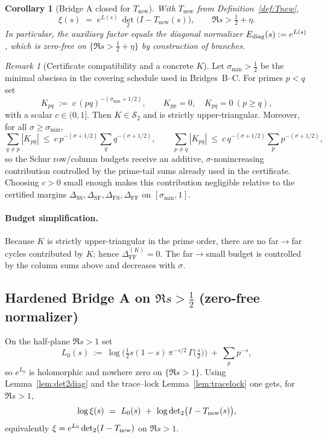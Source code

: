 \documentclass[11pt]{article}
\newtheorem{corollary}[theorem]{Corollary}
\theoremstyle{definition}
\theoremstyle{remark}
\newtheorem{remark}[theorem]{Remark}
\newcommand{\HS}{\mathcal{S}_2}
\begin{document}
\begin{corollary}[Bridge A closed for $T_{\mathrm{new}}$]\label{cor:BA-closed}
With $T_{\mathrm{new}}$ from Definition~\ref{def:Tnew},
\[
  \xi(s)\;=\;e^{L(s)}\,\det_{2}\big(I-T_{\mathrm{new}}(s)\big),\qquad \Re s>\tfrac12+\eta.
\]
In particular, the auxiliary factor equals the diagonal normalizer $E_{\rm diag}(s):=e^{L(s)}$, which is zero-free on $\{\Re s>\tfrac12+\eta\}$ by construction of branches.
\end{corollary}

\begin{remark}[Certificate compatibility and a concrete $K$]\label{rem:K-choice}
Let $\sigma_{\min}>\tfrac12$ be the minimal abscissa in the covering schedule used in Bridges~B--C. For primes $p<q$ set
\[
  K_{pq}\;:=\;c\,(pq)^{-(\sigma_{\min}+1/2)},\qquad K_{pp}=0,\quad K_{pq}=0\ (p\ge q),
\]
with a scalar $c\in(0,1]$. Then $K\in\HS$ and is strictly upper-triangular. Moreover, for all $\sigma\ge\sigma_{\min}$,
\[
  \sum_{q\ne p} |K_{pq}|\ \le\ c\,p^{-(\sigma+1/2)}\sum_{q} q^{-(\sigma+1/2)},\qquad
  \sum_{p\ne q} |K_{pq}|\ \le\ c\,q^{-(\sigma+1/2)}\sum_{p} p^{-(\sigma+1/2)},
\]
so the Schur row/column budgets receive an additive, $\sigma$-nonincreasing contribution controlled by the prime-tail sums already used in the certificate. Choosing $c>0$ small enough makes this contribution negligible relative to the certified margins $\Delta_{\mathrm{SS}},\Delta_{\mathrm{SF}},\Delta_{\mathrm{FS}},\Delta_{\mathrm{FF}}$ on $[\sigma_{\min},1]$.
\end{remark}

\paragraph{Budget simplification.}
Because $K$ is strictly upper-triangular in the prime order, there are no far$\to$far cycles contributed by $K$; hence $\Delta_{\mathrm{FF}}^{(K)}=0$. The far$\to$small budget is controlled by the column sums above and decreases with $\sigma$.

\subsection*{Hardened Bridge A on $\Re s>\tfrac12$ (zero-free normalizer)}\label{subsec:hardened-BridgeA}
On the half-plane $\Re s>1$ set
\[
  L_0(s)\ :=\ \log\!\Big(\tfrac12 s(1-s)\,\pi^{-s/2}\,\Gamma\!\big(\tfrac{s}{2}\big)\Big)
             \ +\ \sum_{p} p^{-s},
\]
so $e^{L_0}$ is holomorphic and nowhere zero on $\{\Re s>1\}$. Using Lemma~\ref{lem:det2diag} and the trace--lock Lemma~\ref{lem:tracelock} one gets, for $\Re s>1$,
\[
  \log\xi(s)\ =\ L_0(s)\ +\ \log\det\nolimits_2\!\big(I-T_{\rm new}(s)\big),
\]
equivalently $\xi=e^{L_0}\det_2(I-T_{\rm new})$ on $\Re s>1$.
\end{document}

